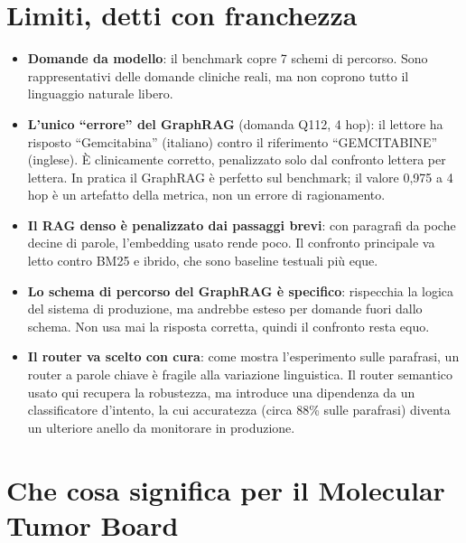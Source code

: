 \documentclass[11pt,a4paper]{report}
\begin{document}
\section{Limiti, detti con franchezza}

\begin{itemize}
  \item \textbf{Domande da modello}: il benchmark copre 7 schemi di
        percorso. Sono rappresentativi delle domande cliniche reali, ma non
        coprono tutto il linguaggio naturale libero.
  \item \textbf{L'unico ``errore'' del GraphRAG} (domanda Q112, 4 hop): il
        lettore ha risposto ``Gemcitabina'' (italiano) contro il
        riferimento ``GEMCITABINE'' (inglese). È clinicamente corretto,
        penalizzato solo dal confronto lettera per lettera. In pratica il
        GraphRAG è perfetto sul benchmark; il valore 0,975 a 4 hop è un
        artefatto della metrica, non un errore di ragionamento.
  \item \textbf{Il RAG denso è penalizzato dai passaggi brevi}: con
        paragrafi da poche decine di parole, l'embedding usato rende poco.
        Il confronto principale va letto contro BM25 e ibrido, che sono
        baseline testuali più eque.
  \item \textbf{Lo schema di percorso del GraphRAG è specifico}: rispecchia
        la logica del sistema di produzione, ma andrebbe esteso per domande
        fuori dallo schema. Non usa mai la risposta corretta, quindi il
        confronto resta equo.
  \item \textbf{Il router va scelto con cura}: come mostra l'esperimento sulle
        parafrasi, un router a parole chiave è fragile alla variazione
        linguistica. Il router semantico usato qui recupera la robustezza, ma
        introduce una dipendenza da un classificatore d'intento, la cui
        accuratezza (circa 88\% sulle parafrasi) diventa un ulteriore anello
        da monitorare in produzione.
\end{itemize}

\section{Che cosa significa per il Molecular Tumor Board}
\end{document}
